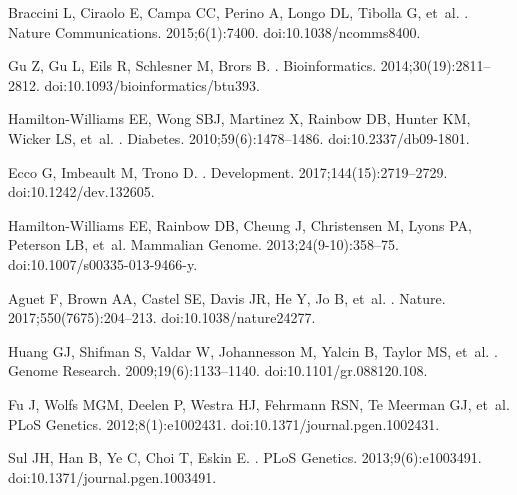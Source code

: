 \documentclass[10pt,letterpaper]{article}
\begin{document}
\begin{thebibliography}{10}
Braccini L, Ciraolo E, Campa CC, Perino A, Longo DL, Tibolla G, et~al.
.
\newblock Nature Communications. 2015;6(1):7400.
\newblock doi:{10.1038/ncomms8400}.

Gu Z, Gu L, Eils R, Schlesner M, Brors B.
.
\newblock Bioinformatics. 2014;30(19):2811--2812.
\newblock doi:{10.1093/bioinformatics/btu393}.

Hamilton-Williams EE, Wong SBJ, Martinez X, Rainbow DB, Hunter KM, Wicker LS,
  et~al.
.
\newblock Diabetes. 2010;59(6):1478--1486.
\newblock doi:{10.2337/db09-1801}.

Ecco G, Imbeault M, Trono D.
.
\newblock Development. 2017;144(15):2719--2729.
\newblock doi:{10.1242/dev.132605}.

Hamilton-Williams EE, Rainbow DB, Cheung J, Christensen M, Lyons PA, Peterson
  LB, et~al.
\newblock Mammalian Genome. 2013;24(9-10):358--75.
\newblock doi:{10.1007/s00335-013-9466-y}.

Aguet F, Brown AA, Castel SE, Davis JR, He Y, Jo B, et~al.
.
\newblock Nature. 2017;550(7675):204--213.
\newblock doi:{10.1038/nature24277}.

Huang GJ, Shifman S, Valdar W, Johannesson M, Yalcin B, Taylor MS, et~al.
.
\newblock Genome Research. 2009;19(6):1133--1140.
\newblock doi:{10.1101/gr.088120.108}.

Fu J, Wolfs MGM, Deelen P, Westra HJ, Fehrmann RSN, {Te Meerman} GJ, et~al.
\newblock PLoS Genetics. 2012;8(1):e1002431.
\newblock doi:{10.1371/journal.pgen.1002431}.

Sul JH, Han B, Ye C, Choi T, Eskin E.
.
\newblock PLoS Genetics. 2013;9(6):e1003491.
\newblock doi:{10.1371/journal.pgen.1003491}.


\end{thebibliography}
\end{document}
